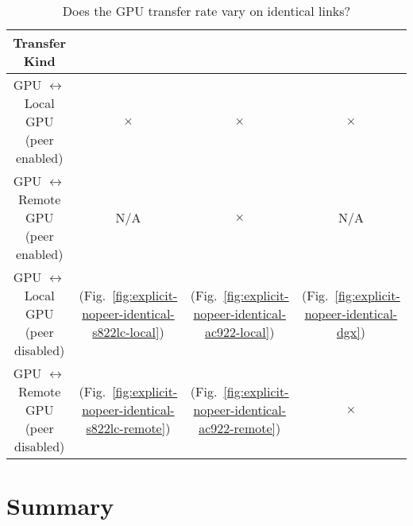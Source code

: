 \begin{table}[ht]
	\centering
	\caption[Matrix: Transfer rate on Identical Links]{Does the GPU transfer rate vary on identical links?}
	\label{tab:explicit}
	\begin{tabular}{|c|c|c|c|}
		\hline
		\textbf{Transfer Kind}                      \\ \hline 
		\makecell{ GPU $\leftrightarrow$ Local GPU  \\ (peer enabled)  } & $\times$                                                            & $\times$                                                           & $\times$                                                  \\ \hline
		\makecell{ GPU $\leftrightarrow$ Remote GPU \\ (peer enabled)  } & N/A                                                                 & $\times$                                                           & N/A                                                       \\ \hline
		\makecell{ GPU $\leftrightarrow$ Local GPU  \\ (peer disabled) } & \checkmark (Fig.~\ref{fig:explicit-nopeer-identical-s822lc-local})  & \checkmark (Fig.~\ref{fig:explicit-nopeer-identical-ac922-local})  & \checkmark (Fig.~\ref{fig:explicit-nopeer-identical-dgx}) \\ \hline
		\makecell{ GPU $\leftrightarrow$ Remote GPU \\ (peer disabled) } & \checkmark (Fig.~\ref{fig:explicit-nopeer-identical-s822lc-remote}) & \checkmark (Fig.~\ref{fig:explicit-nopeer-identical-ac922-remote}) & $\times$                                                  \\ \hline
	\end{tabular}
\end{table}

\section{Summary}


